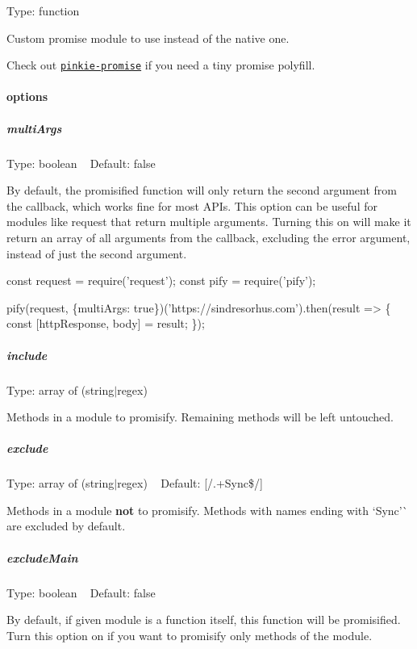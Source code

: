 Type\+: {\ttfamily function}

Custom promise module to use instead of the native one.

Check out \href{https://github.com/floatdrop/pinkie-promise}{\tt {\ttfamily pinkie-\/promise}} if you need a tiny promise polyfill.

\paragraph*{options}

\subparagraph*{multi\+Args}

Type\+: {\ttfamily boolean} ~\newline
Default\+: {\ttfamily false}

By default, the promisified function will only return the second argument from the callback, which works fine for most A\+P\+Is. This option can be useful for modules like {\ttfamily request} that return multiple arguments. Turning this on will make it return an array of all arguments from the callback, excluding the error argument, instead of just the second argument.


\begin{DoxyCode}
const request = require('request');
const pify = require('pify');

pify(request, \{multiArgs: true\})('https://sindresorhus.com').then(result => \{
    const [httpResponse, body] = result;
\});
\end{DoxyCode}


\subparagraph*{include}

Type\+: {\ttfamily array} of ({\ttfamily string}$\vert${\ttfamily regex})

Methods in a module to promisify. Remaining methods will be left untouched.

\subparagraph*{exclude}

Type\+: {\ttfamily array} of ({\ttfamily string}$\vert${\ttfamily regex}) ~\newline
Default\+: {\ttfamily \mbox{[}/.+\+Sync\$/\mbox{]}}

Methods in a module {\bfseries not} to promisify. Methods with names ending with `\textquotesingle{}Sync'\`{} are excluded by default.

\subparagraph*{exclude\+Main}

Type\+: {\ttfamily boolean} ~\newline
Default\+: {\ttfamily false}

By default, if given module is a function itself, this function will be promisified. Turn this option on if you want to promisify only methods of the module.



